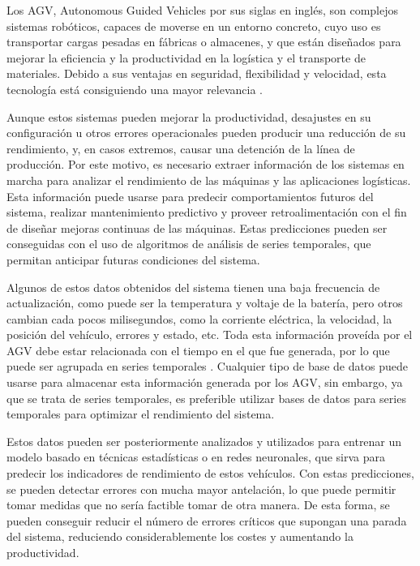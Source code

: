 

Los AGV, Autonomous Guided Vehicles por sus siglas en inglés, son complejos sistemas robóticos, 
capaces de moverse en un entorno concreto, cuyo uso es transportar cargas pesadas en fábricas o 
almacenes, y que están diseñados para mejorar la eficiencia y la productividad en la logística 
y el transporte de materiales. Debido a sus ventajas en seguridad, flexibilidad y velocidad,
esta tecnología está consiguiendo una mayor relevancia \cite{espinosa2020transporte}.

Aunque estos sistemas pueden mejorar la productividad, desajustes en su configuración u otros
errores operacionales pueden producir una reducción de su rendimiento, y, en casos extremos,
causar una detención de la línea de producción. Por este motivo, es necesario extraer información
de los sistemas en marcha para analizar el rendimiento de las máquinas y las aplicaciones logísticas.
Esta información puede usarse para predecir comportamientos futuros del sistema, realizar mantenimiento
predictivo y proveer retroalimentación con el fin de diseñar mejoras continuas de las máquinas. Estas
predicciones pueden ser conseguidas con el uso de algoritmos de análisis de series temporales, que
permitan anticipar futuras condiciones del sistema. \cite{BARUQUE201949}

Algunos de estos datos obtenidos del sistema tienen una baja frecuencia de actualización, como puede
ser la temperatura y voltaje de la batería, pero otros cambian cada pocos milisegundos, como la
corriente eléctrica, la velocidad, la posición del vehículo, errores y estado, etc. Toda esta
información proveída por el AGV debe estar relacionada con el tiempo en el que fue generada, por
lo que puede ser agrupada en series temporales \cite{DBLP:journals/corr/abs-2104-00164}. Cualquier
tipo de base de datos puede usarse para almacenar esta información generada por los AGV, sin embargo,
ya que se trata de series temporales, es preferible utilizar bases de datos para series temporales
para optimizar el rendimiento del sistema.

Estos datos pueden ser posteriormente analizados y utilizados para entrenar un modelo basado en técnicas 
estadísticas o en redes neuronales, que sirva para predecir los indicadores de rendimiento de estos vehículos.
Con estas predicciones, se pueden detectar errores con mucha mayor antelación, lo que puede permitir tomar 
medidas que no sería factible tomar de otra manera. De esta forma, se pueden conseguir reducir el número 
de errores críticos que supongan una parada del sistema, reduciendo considerablemente los costes y aumentando 
la productividad.

